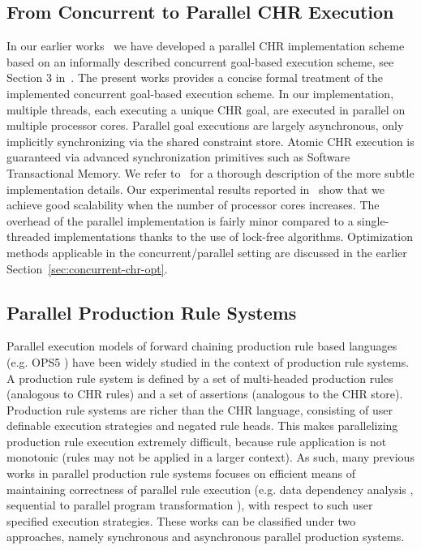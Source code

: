 \documentclass{tlp}
\begin{document}
\subsection{From Concurrent to Parallel CHR Execution} \label{sec:from-concurrent-to-parallel}

In our earlier works~\cite{chr-stm,parallel-chr} we have developed a parallel CHR implementation
scheme based on an informally described concurrent goal-based execution scheme, 
see Section 3 in~\cite{parallel-chr}. 
The present works provides a concise formal treatment of the implemented concurrent goal-based 
execution scheme. In our implementation, multiple threads, each executing a unique CHR goal, 
are executed in parallel on multiple processor cores. Parallel goal executions are largely asynchronous, 
only implicitly synchronizing via the shared constraint store. Atomic CHR execution is guaranteed via 
advanced synchronization primitives such as Software Transactional Memory.
We refer to~\cite{parallel-chr} for a thorough description of the more subtle implementation details.
Our experimental results reported in~\cite{parallel-chr} show that we achieve good scalability
when the number of processor cores increases. The overhead of the parallel implementation 
is fairly minor compared to a single-threaded implementations thanks to the use of lock-free algorithms.
Optimization methods applicable in the concurrent/parallel setting
are discussed in the earlier Section~\ref{sec:concurrent-chr-opt}.


\subsection{Parallel Production Rule Systems}

Parallel execution models of forward chaining production rule based languages 
(e.g. OPS5 \cite{ForgyM77}) have been widely studied in the context of production 
rule systems. A production rule system is defined by a set of multi-headed 
production rules (analogous to CHR rules) and a set of assertions (analogous to 
the CHR store). Production rule systems are richer than the CHR language, consisting of
user definable execution strategies and negated rule heads. This makes parallelizing 
production rule execution extremely difficult, because rule application is not monotonic 
(rules may not be applied in a larger context). As such, many previous works in parallel 
production rule systems focuses on efficient means of maintaining correctness of parallel 
rule execution (e.g. data dependency analysis \cite{627435}, sequential to parallel program 
transformation \cite{98939}), with respect to such user specified execution strategies. 
These works can be classified under two approaches, namely synchronous and asynchronous 
parallel production systems.
\end{document}
